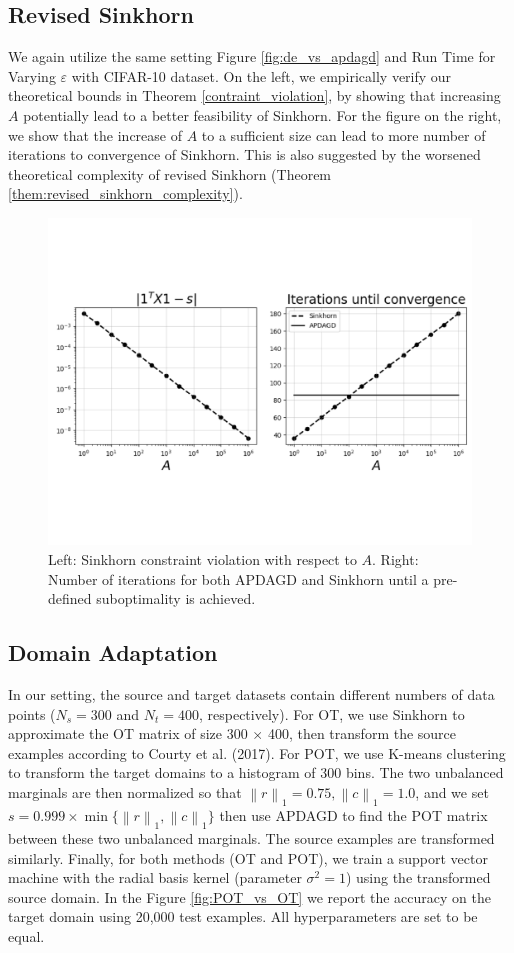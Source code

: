 \subsection{Revised Sinkhorn}
We again utilize the same setting Figure \ref{fig:de_vs_apdagd} and Run Time for Varying $\varepsilon$ with CIFAR-10 dataset. On the left, we empirically verify our theoretical bounds in Theorem \ref{contraint_violation}, by showing that increasing $A$ potentially lead to a better feasibility of Sinkhorn. For the figure on the right, we show that the increase of $A$ to a sufficient size can lead to more number of iterations to convergence of Sinkhorn. This is also suggested by the worsened theoretical complexity of revised Sinkhorn (Theorem \ref{them:revised_sinkhorn_complexity}).
\begin{figure}
    \centering
    \includegraphics[width=0.8\linewidth]{figs/revised_sinkhorn.pdf}
    \caption{Left: Sinkhorn constraint violation with respect to $A$. Right: Number of iterations for both APDAGD and Sinkhorn until a pre-defined suboptimality is achieved.}
    \label{fig:revised_sinkhorn}
\end{figure}

\subsection{Domain Adaptation}
In our setting, the source and target datasets contain different numbers of data points ($N_s = 300$ and $N_t = 400$, respectively). For OT, we use Sinkhorn to approximate the OT matrix of size 300 $\times$ 400, then transform the source examples according to Courty et al. (2017). For POT, we use K-means clustering to transform the target domains to a histogram of $300$ bins. The two unbalanced marginals are then normalized so that $\left\| r \right\|_1 = 0.75, \left\| c \right\|_1 = 1.0$, and we set $s = 0.999 \times \min\{ \left\| r \right\|_1, \left\| c \right\|_1 \}$ then use APDAGD to find the POT matrix between these two unbalanced marginals. The source examples are transformed similarly. Finally, for both methods (OT and POT), we train a support vector machine with the radial basis kernel (parameter $\sigma^2 = 1$) using the transformed source domain. In the Figure \ref{fig:POT_vs_OT} we report the accuracy on the target domain using 20,000 test examples. All hyperparameters are set to be equal.


